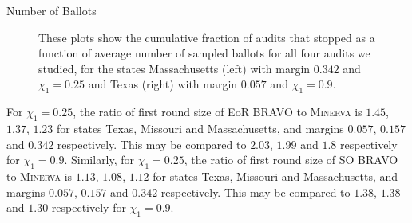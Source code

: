 \documentclass[final]{beamer}
\newcommand{\Minerva}{\textsc{Minerva}\xspace}
\newcommand{\BRAVO}{\textsc{BRAVO}\xspace}
\newlength{\colwidth}
\begin{document}
\begin{frame}[t]
\begin{columns}[t]
\begin{column}{\colwidth}
\begin{block}{Number of Ballots}
\begin{figure}[h]
\begin{minipage}{.49\textwidth}
\begin{centering}
\label{fig:texas_90}
\end{centering}
\end{minipage}
\caption{These plots show the cumulative fraction of audits that stopped as a function of average number of sampled ballots for all four audits we studied, for the states Massachusetts (left) with margin $0.342$ and $\chi_1=0.25$ and Texas (right) with margin $0.057$ and $\chi_1=0.9$.}
\end{figure}

For $\chi_1=0.25$, the ratio of first round size of EoR \BRAVO to \Minerva is $1.45$, $1.37$, $1.23$ for states Texas, Missouri and Massachusetts, and margins $0.057$, $0.157$ and $0.342$ respectively. This may be compared to $2.03$, $1.99$ and $1.8$ respectively for $\chi_1=0.9$. Similarly, for $\chi_1=0.25$, the ratio of first round size of SO \BRAVO to \Minerva is $1.13$, $1.08$, $1.12$ for states Texas, Missouri and Massachusetts, and margins $0.057$, $0.157$ and $0.342$ respectively. This may be compared to $1.38$, $1.38$ and $1.30$ respectively for $\chi_1=0.9$. 


\end{block}





%
%





\end{column}
\end{columns}
\end{frame}
\end{document}
